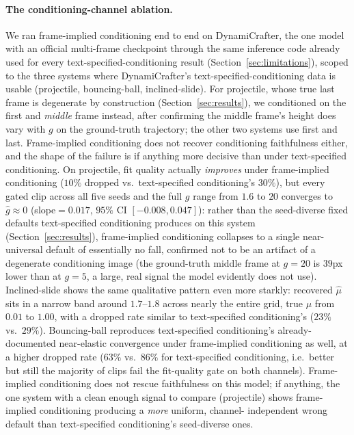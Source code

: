 \documentclass[10pt,twocolumn,letterpaper]{article}
\begin{document}
\paragraph{The conditioning-channel ablation.}
We ran frame-implied conditioning end to end on DynamiCrafter, the one
model with an official multi-frame checkpoint through the same inference
code already used for every text-specified-conditioning result (Section~\ref{sec:limitations}),
scoped to the three systems where DynamiCrafter's text-specified-conditioning data is usable
(projectile, bouncing-ball, inclined-slide). For projectile, whose true
last frame is degenerate by construction (Section~\ref{sec:results}), we
conditioned on the first and \emph{middle} frame instead, after confirming
the middle frame's height does vary with $g$ on the ground-truth
trajectory; the other two systems use first and last. Frame-implied conditioning does not recover
conditioning faithfulness either, and the shape of the failure is if
anything more decisive than under text-specified conditioning. On projectile, fit quality actually
\emph{improves} under frame-implied conditioning ($10\%$ dropped vs.\ text-specified conditioning's $30\%$), but every
gated clip across all five seeds and the full $g$ range from $1.6$ to $20$
converges to $\hat g\approx 0$ (slope$=0.017$, $95\%$ CI
$[-0.008,0.047]$): rather than the seed-diverse fixed defaults text-specified conditioning produces
on this system (Section~\ref{sec:results}), frame-implied conditioning collapses to a single
near-universal default of essentially no fall, confirmed not to be an
artifact of a degenerate conditioning image (the ground-truth middle frame
at $g=20$ is $39$px lower than at $g=5$, a large, real signal the model
evidently does not use). Inclined-slide shows the same qualitative pattern
even more starkly: recovered $\hat\mu$ sits in a narrow band around
$1.7$--$1.8$ across nearly the entire grid, true $\mu$ from $0.01$ to
$1.00$, with a dropped rate similar to text-specified conditioning's ($23\%$ vs.\ $29\%$).
Bouncing-ball reproduces text-specified conditioning's already-documented near-elastic convergence
under frame-implied conditioning as well, at a higher dropped rate ($63\%$ vs.\ $86\%$ for text-specified conditioning,
i.e.\ better but still the majority of clips fail the fit-quality gate on
both channels). Frame-implied conditioning does not rescue faithfulness on
this model; if anything, the one system with a clean enough signal to
compare (projectile) shows frame-implied conditioning producing a \emph{more} uniform, channel-
independent wrong default than text-specified conditioning's seed-diverse ones.
\end{document}
